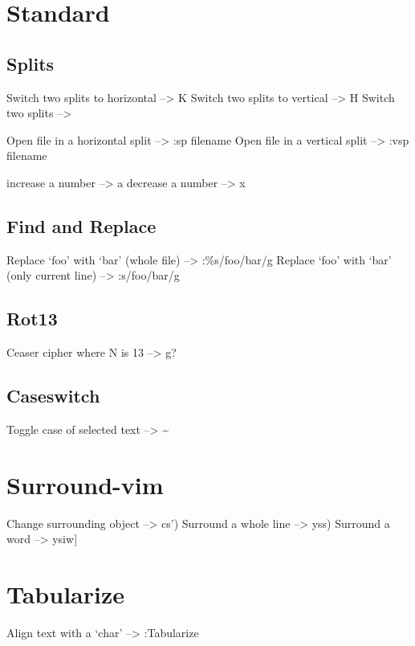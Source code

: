 \section{Standard}\label{standard}

\subsection{Splits}\label{splits}

Switch two splits to horizontal --\textgreater{} K Switch two splits to
vertical --\textgreater{} H Switch two splits --\textgreater{}

Open file in a horizontal split --\textgreater{} :sp filename Open file
in a vertical split --\textgreater{} :vsp filename

increase a number --\textgreater{} a decrease a number --\textgreater{}
x

\subsection{Find and Replace}\label{find-and-replace}

Replace `foo' with `bar' (whole file) --\textgreater{} :\%s/foo/bar/g
Replace `foo' with `bar' (only current line) --\textgreater{}
:s/foo/bar/g

\subsection{Rot13}\label{rot13}

Ceaser cipher where N is 13 --\textgreater{} g?

\subsection{Caseswitch}\label{caseswitch}

Toggle case of selected text --\textgreater{} \textasciitilde{}

\section{Surround-vim}\label{surround-vim}

Change surrounding object --\textgreater{} cs') Surround a whole line
--\textgreater{} yss) Surround a word --\textgreater{} ysiw{]}

\section{Tabularize}\label{tabularize}

Align text with a `char' --\textgreater{} :Tabularize \char
